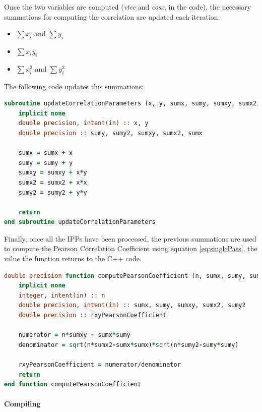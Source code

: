 Once the two variables are computed (\textit{vtec} and \textit{cosx}, in the code), the necessary summations for computing the correlation are updated each iteration:

\begin{itemize}
	\item $\sum x_{i}$ and $\sum y_{i}$
	\item $\sum x_{i}y_{i}$
	\item $\sum x_{i}^{2}$ and $\sum y_{i}^{2}$
\end{itemize}

The following code updates this summations:

\begin{minipage}{\linewidth}
\begin{lstlisting}[language=Fortran, caption=Function to update the necessary summations]
subroutine updateCorrelationParameters (x, y, sumx, sumy, sumxy, sumx2, sumy2)
	implicit none
	double precision, intent(in) :: x, y
	double precision :: sumy, sumy2, sumxy, sumx2, sumx

	sumx = sumx + x
	sumy = sumy + y
	sumxy = sumxy + x*y
	sumx2 = sumx2 + x*x
	sumy2 = sumy2 + y*y

	return
end subroutine updateCorrelationParameters
\end{lstlisting}
\end{minipage}

Finally, once all the IPPs have been processed, the previous summations are used to compute the Pearson Correlation Coefficient using equation \ref{eq:singlePass}, the value the function returns to the C++ code.

\begin{minipage}{\linewidth}
\begin{lstlisting}[language=Fortran, caption=Function to compute the correlation coefficient using the summations]
double precision function computePearsonCoefficient (n, sumx, sumy, sumxy, sumx2, sumy2)
	implicit none
	integer, intent(in) :: n
	double precision, intent(in) :: sumx, sumy, sumxy, sumx2, sumy2 
	double precision :: rxyPearsonCoefficient

	numerator = n*sumxy - sumx*sumy
	denominator = sqrt(n*sumx2-sumx*sumx)*sqrt(n*sumy2-sumy*sumy)

	rxyPearsonCoefficient = numerator/denominator
	return
end function computePearsonCoefficient
\end{lstlisting}
\end{minipage}

\paragraph{Compiling}

